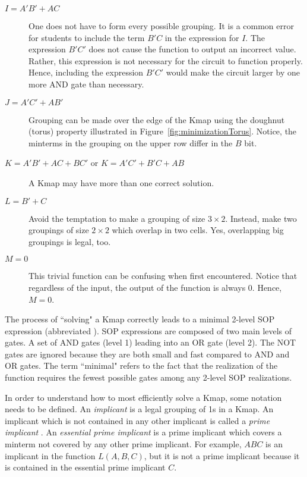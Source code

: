 \begin{changemargin}{1.5cm}{1.5cm}
\begin{description}
\item [$I=A'B'+AC$]
    One does not have to form every possible grouping.  It is
    a common error for students to include the term $B'C$ in the expression
    for $I$.  The expression $B'C'$  does not cause the function to output
    an incorrect value. Rather, this expression is not necessary for the
    circuit to function properly.  Hence, including the expression $B'C'$
    would make the circuit larger by one more AND gate than necessary.

\item [$J=A'C'+AB'$]
    Grouping can be made over the edge of the Kmap using the doughnut
     (torus) property illustrated in Figure~\ref{fig:minimizationTorus}.
    Notice, the minterms in the grouping on the upper row
    differ in the $B$ bit.

\item [$K=A'B'+AC+BC'$ or $K=A'C'+B'C+AB$]
    A Kmap may have more than one correct solution.

\item [$L=B'+C$]
    Avoid the temptation to make a grouping of size $3 \times 2$.
    Instead, make two groupings of size $2 \times 2$ which overlap
    in two cells.  Yes, overlapping big groupings is legal, too.

\item [$M=0$]
    This trivial function can be confusing when first encountered.
    Notice that regardless of the input, the output of the function
    is always 0.  Hence, $M=0$.
\end{description}
\end{changemargin}

The process of ``solving" a Kmap correctly leads to a minimal 2-level
SOP expression (abbreviated \SOPmin).  SOP expressions are composed
of two main levels of gates. A set of AND gates (level 1) leading
into an OR gate (level 2).  The NOT gates are ignored because they are
both small and fast compared to AND and OR gates.  The term ``minimal"
refers to the fact that the realization of the function requires
the fewest possible gates among any 2-level SOP realizations.

In order to understand how to most efficiently solve a Kmap, some
notation needs to be defined.
An \textit{implicant}  is a legal grouping of 1s in
a Kmap.  An implicant which is not contained in any other implicant
is called a \textit{prime implicant} .  An
\textit{essential prime implicant} 
is a prime implicant which covers a minterm not covered by any other
prime implicant. For example, $ABC$ is an implicant in the function
$L(A,B,C)$, but it is not a prime implicant because it is contained in
the essential prime implicant $C$.

